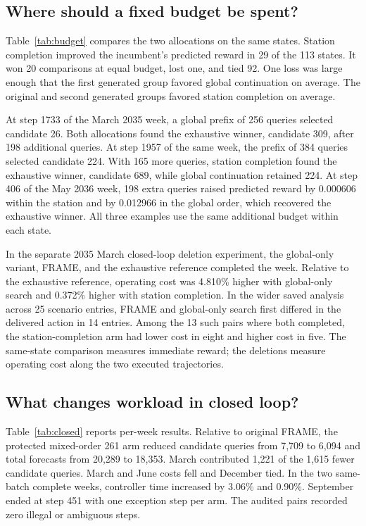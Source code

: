 \documentclass[sigconf,review,anonymous]{acmart}
\begin{document}
\subsection{Where should a fixed budget be spent?}
Table~\ref{tab:budget} compares the two allocations on the same states. Station completion improved the incumbent's predicted reward in 29 of the 113 states. It won 20 comparisons at equal budget, lost one, and tied 92. One loss was large enough that the first generated group favored global continuation on average. The original and second generated groups favored station completion on average.



At step 1733 of the March 2035 week, a global prefix of 256 queries selected candidate 26. Both allocations found the exhaustive winner, candidate 309, after 198 additional queries. At step 1957 of the same week, the prefix of 384 queries selected candidate 224. With 165 more queries, station completion found the exhaustive winner, candidate 689, while global continuation retained 224. At step 406 of the May 2036 week, 198 extra queries raised predicted reward by 0.000606 within the station and by 0.012966 in the global order, which recovered the exhaustive winner. All three examples use the same additional budget within each state.

In the separate 2035 March closed-loop deletion experiment, the global-only variant, FRAME, and the exhaustive reference completed the week. Relative to the exhaustive reference, operating cost was 4.810\% higher with global-only search and 0.372\% higher with station completion. In the wider saved analysis across 25 scenario entries, FRAME and global-only search first differed in the delivered action in 14 entries. Among the 13 such pairs where both completed, the station-completion arm had lower cost in eight and higher cost in five. The same-state comparison measures immediate reward; the deletions measure operating cost along the two executed trajectories.

\subsection{What changes workload in closed loop?}
Table~\ref{tab:closed} reports per-week results. Relative to original FRAME, the protected mixed-order 261 arm reduced candidate queries from 7,709 to 6,094 and total forecasts from 20,289 to 18,353. March contributed 1,221 of the 1,615 fewer candidate queries. March and June costs fell and December tied. In the two same-batch complete weeks, controller time increased by 3.06\% and 0.90\%. September ended at step 451 with one exception step per arm. The audited pairs recorded zero illegal or ambiguous steps.
\end{document}
